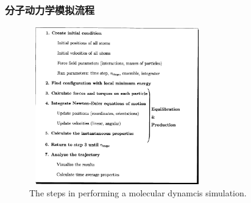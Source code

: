 \frame
{
	\frametitle{分子动力学模拟流程}
\begin{figure}[h!]
\centering
\vspace{-10.0pt}
\includegraphics[height=2.70in,width=3.00in,viewport=30 20 750 794,clip]{Figures/The-molecular_dynamcis_algorithm.png}
\caption{\textrm{The steps in performing a molecular dynamcis simulation.}}
\label{The-molecular-dynamics_algorithm}
\end{figure}
}

